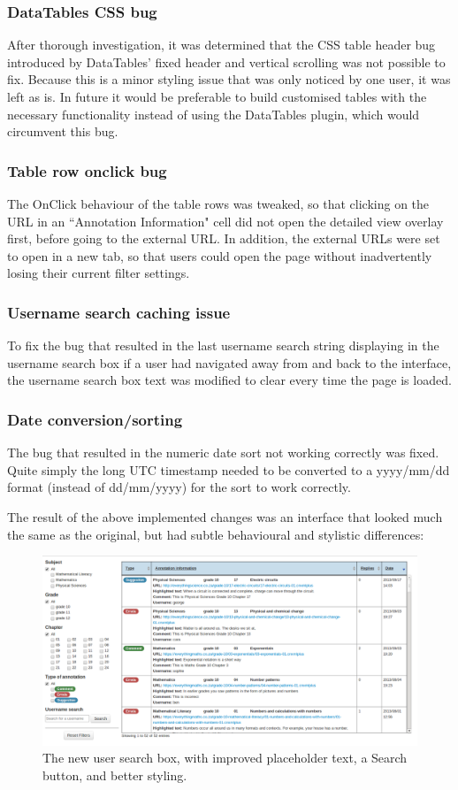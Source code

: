 \subsubsection{DataTables CSS bug}
After thorough investigation, it was determined that the CSS table header bug introduced by DataTables’ fixed header and vertical scrolling was not possible to fix. Because this is a minor styling issue that was only noticed by one user, it was left as is. In future it would be preferable to build customised tables with the necessary functionality instead of using the DataTables plugin, which would circumvent this bug.

\subsubsection{Table row onclick bug}
The OnClick behaviour of the table rows was tweaked, so that clicking on the URL in an ``Annotation Information" cell did not open the detailed view overlay first, before going to the external URL. In addition, the external URLs were set to open in a new tab, so that users could open the page without inadvertently losing their current filter settings. 

\subsubsection{Username search caching issue}
To fix the bug that resulted in the last username search string displaying in the username search box if a user had navigated away from and back to the interface, the username search box text was modified to clear every time the page is loaded. 

\subsubsection{Date conversion/sorting}
The bug that resulted in the numeric date sort not working correctly was fixed. Quite simply the long UTC timestamp needed to be converted to a yyyy/mm/dd format (instead of dd/mm/yyyy) for the sort to work correctly. 

The result of the above implemented changes was an interface that looked much the same as the original, but had subtle behavioural and stylistic differences: 
\begin{figure}[h!]
    \centering
    \includegraphics[width=\textwidth]{Figures/V2/wholeUI.png}
 \caption{The new user search box, with improved placeholder text, a Search button, and better styling.}
\end{figure}